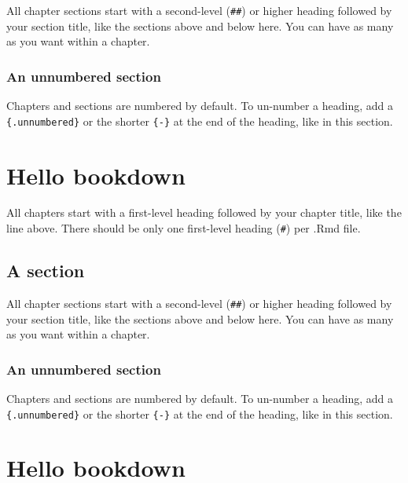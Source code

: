 \documentclass[
]{book}
\theoremstyle{definition}
\theoremstyle{definition}
\theoremstyle{definition}
\theoremstyle{definition}
\theoremstyle{remark}
\begin{document}
All chapter sections start with a second-level (\texttt{\#\#}) or higher heading followed by your section title, like the sections above and below here. You can have as many as you want within a chapter.

\hypertarget{an-unnumbered-section-2}{%
\subsection*{An unnumbered section}\label{an-unnumbered-section-2}}

Chapters and sections are numbered by default. To un-number a heading, add a \texttt{\{.unnumbered\}} or the shorter \texttt{\{-\}} at the end of the heading, like in this section.

\hypertarget{hello-bookdown-3}{%
\chapter{Hello bookdown}\label{hello-bookdown-3}}

All chapters start with a first-level heading followed by your chapter title, like the line above. There should be only one first-level heading (\texttt{\#}) per .Rmd file.

\hypertarget{a-section-3}{%
\section{A section}\label{a-section-3}}

All chapter sections start with a second-level (\texttt{\#\#}) or higher heading followed by your section title, like the sections above and below here. You can have as many as you want within a chapter.

\hypertarget{an-unnumbered-section-3}{%
\subsection*{An unnumbered section}\label{an-unnumbered-section-3}}

Chapters and sections are numbered by default. To un-number a heading, add a \texttt{\{.unnumbered\}} or the shorter \texttt{\{-\}} at the end of the heading, like in this section.

\hypertarget{hello-bookdown-4}{%
\chapter{Hello bookdown}\label{hello-bookdown-4}}
\end{document}
